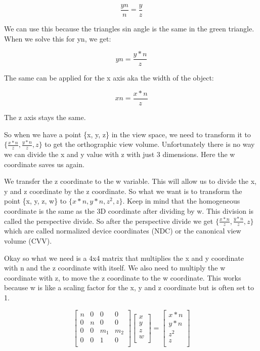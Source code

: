 \documentclass[12pt]{report} \usepackage{preamble}
\begin{document}
\[
	\frac{yn}{n} = \frac{y}{z}
\]

We can use this because the triangles sin angle is the same in the green triangle.
When we solve this for yn, we get:

\[
	yn = \frac{y * n}{z}
\]

The same can be applied for the x axis aka the width of the object:

\[
	xn = \frac{x * n}{z}
\]

The z axis stays the same.

So when we have a point \{x, y, z\} in the view space, we need to transform it to \\
\(\{\frac{x * n}{z}, \frac{y * n}{z}, z\}\) to get the orthographic view volume. Unfortunately
there is no way we can divide the x and y value with z with just 3 dimensions.
Here the w coordinate saves us again.

We transfer the z coordinate to the w variable.
This will allow us to divide the x, y and z coordinate by the z coordinate.
So what we want is to transform the point \{x, y, z, w\} to \(\{x * n, y * n, z^2, z\}\).
Keep in mind that the homogeneous coordinate is the same as the 3D coordinate after dividing by w.
This division is called the perspective divide.
So after the perspective divide we get \(\{\frac{x * n}{z}, \frac{y * n}{z}, z\}\) which are
called normalized device coordinates (NDC) or the canonical view volume (CVV).

Okay so what we need is a 4x4 matrix that multiplies the x and y coordinate with n and the z coordinate
with itself. We also need to multiply the w coordinate with z,
to move the z coordinate to the w coordinate. This works because
w is like a scaling factor for the x, y and z coordinate but is often set to 1.

\[
	\begin{bmatrix}
		n & 0 & 0   & 0   \\
		0 & n & 0   & 0   \\
		0 & 0 & m_1 & m_2 \\
		0 & 0 & 1   & 0   \\
	\end{bmatrix}
	\begin{bmatrix}
		x \\
		y \\
		z \\
		w \\
	\end{bmatrix}
	=
	\begin{bmatrix}
		x * n \\
		y * n \\
		z^2   \\
		z     \\
	\end{bmatrix}
\]
\end{document}

